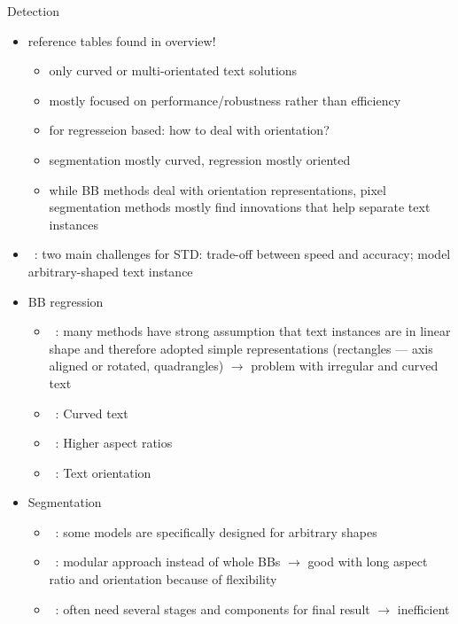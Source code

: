 Detection
\begin{itemize}
    \item reference tables found in overview!
        \begin{itemize}
            \item only curved or multi-orientated text solutions
            \item mostly focused on performance/robustness rather than efficiency
            \item for regresseion based: how to deal with orientation?
            \item segmentation mostly curved, regression mostly oriented
            \item while BB methods deal with orientation representations, pixel segmentation methods
                mostly find innovations that help separate text instances
        \end{itemize}
    \item~\cite{wang_efficient_2019}: two main challenges for \ac{STD}:
        trade-off between speed and accuracy; model arbitrary-shaped text instance
    \item BB regression
        \begin{itemize}
            \item~\cite{ferrari_textsnake_2018}: many methods have strong assumption that text
                instances are in linear shape and therefore adopted simple representations
                (rectangles --- axis aligned or rotated, quadrangles)
                $\rightarrow$ problem with irregular and curved text
            \item~\citep{long_scene_2021}: Curved text
            \item~\cite{long_scene_2021,shi_detecting_2017}: Higher aspect ratios
            \item~\cite{shi_detecting_2017}: Text orientation
        \end{itemize}
    \item Segmentation
        \begin{itemize}
            \item~\cite{ferrari_textsnake_2018}: some models are specifically designed for
                arbitrary shapes
            \item~\cite{shi_detecting_2017}: modular approach instead of whole \acp{BB}
                $\rightarrow$ good with long aspect ratio and orientation because of flexibility
            \item~\cite{dai_fused_2018}: often need several stages and components for final result
                $\rightarrow$ inefficient
        \end{itemize}
\end{itemize}

